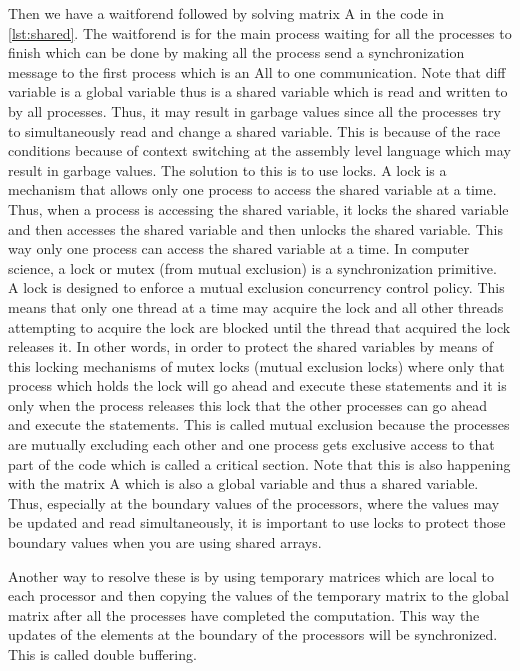 \documentclass[12pt]{book}
\begin{document}
Then we have a waitforend followed by solving matrix A in the code in \ref{lst:shared}.
The waitforend is for the main process waiting for all the processes to finish which can be done by making all the process 
send a synchronization message to the first process which is an All to one communication.
Note that diff variable is a global variable thus is a shared variable which is read and written to by all processes.
Thus, it may result in garbage values since all the processes try to simultaneously read and change a shared variable. This is because of the race conditions
because of context switching at the assembly level language which may result in garbage values.
The solution to this is to use locks. A lock is a mechanism that allows only one process to access the shared variable at a time. Thus, when a process is accessing the shared variable, it locks the shared variable and then
accesses the shared variable and then unlocks the shared variable. This way only one process can access the shared variable at a time.
In computer science, a lock or mutex (from mutual exclusion) is a synchronization primitive. A lock is designed to enforce a mutual exclusion concurrency control policy. This means that only one thread at a time may acquire the lock and all other threads attempting to acquire the lock are blocked until the thread that acquired the lock releases it.
In other words, in order to protect the shared variables by means of this locking mechanisms of mutex locks (mutual exclusion locks) where only that
process which holds the lock will go ahead and execute these statements and it is only when the process releases this lock 
that the other processes can go ahead and execute the statements. This is called mutual exclusion because the processes are mutually
excluding each other and one process gets exclusive access to that part of the code which is called a critical section.
Note that this is also happening with the matrix A which is also a global variable and thus a shared variable. Thus, especially at the boundary values
of the processors, where the values may be updated and read simultaneously, it is important to
use locks to protect those boundary values when you are using shared arrays.

Another way to resolve these is by using temporary matrices which are local to each processor and then copying the values of the temporary matrix to the global matrix after all the processes have completed the computation.
This way the updates of the elements at the boundary of the processors will be synchronized. This is called double buffering.
\end{document}
